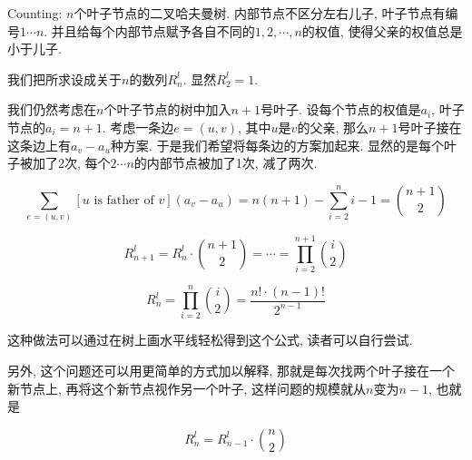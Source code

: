 	\begin{prob} [二叉树$\uppercase\expandafter{\romannumeral3}$]
		
		Counting: $n$个叶子节点的二叉哈夫曼树. 内部节点不区分左右儿子, 叶子节点有编号$1\cdots n$. 并且给每个内部节点赋予各自不同的$1, 2, \cdots, n$的权值, 使得父亲的权值总是小于儿子.
		
		\sol
		我们把所求设成关于$n$的数列$R_n^l$. 显然$R_2^l = 1$.
		
		我们仍然考虑在$n$个叶子节点的树中加入${n + 1}$号叶子. 设每个节点的权值是$a_i$, 叶子节点的$a_i = n + 1$. 考虑一条边$e = (u, v)$, 其中$u$是$v$的父亲, 那么$n + 1$号叶子接在这条边上有$a_v - a_u$种方案. 于是我们希望将每条边的方案加起来. 显然的是每个叶子被加了2次, 每个$2 \cdots n$的内部节点被加了1次, 减了两次.
		
		\begin{equation*}
			\sum_{e = (u, v)}[u\text{ is father of }v](a_v - a_u) 
			= n(n + 1) - \sum_{i = 2}^{n}i - 1 = \binom{n + 1}{2}
		\end{equation*}
		
		\begin{equation*}
			R_{n + 1}^l = R_n^l \cdot \binom{n + 1}{2} = \cdots = \prod_{i = 2}^{n + 1}\binom{i}{2}
		\end{equation*}
		
		\begin{equation*}
		R_{n}^l = \prod_{i = 2}^{n}\binom{i}{2} = \dfrac{n! \cdot (n - 1)!}{2 ^ {n - 1}}
		\end{equation*}
		
		这种做法可以通过在树上画水平线轻松得到这个公式, 读者可以自行尝试.
		
		另外, 这个问题还可以用更简单的方式加以解释, 那就是每次找两个叶子接在一个新节点上, 再将这个新节点视作另一个叶子, 这样问题的规模就从$n$变为$n - 1$, 也就是		
		
		\begin{equation*}
		R_{n}^l = R_{n - 1}^l \cdot \binom{n}{2}
		\end{equation*}
		
	\end{prob}

